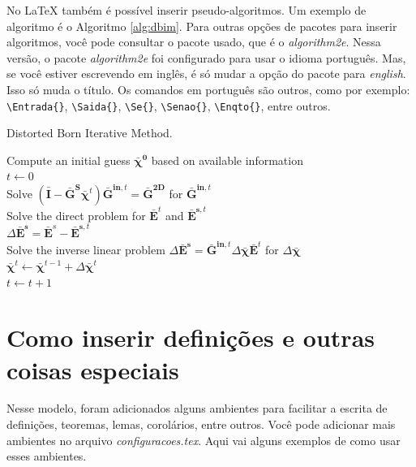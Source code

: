 		No LaTeX também é possível inserir pseudo-algoritmos. Um exemplo de algoritmo é o Algoritmo \ref{alg:dbim}. Para outras opções de pacotes para inserir algoritmos, você pode consultar o pacote usado, que é o \textit{algorithm2e}. Nessa versão, o pacote \textit{algorithm2e} foi configurado para usar o idioma português. Mas, se você estiver escrevendo em inglês, é só mudar a opção do pacote para \textit{english}. Isso só muda o título. Os comandos em português são outros, como por exemplo: \verb|\Entrada{}|, \verb|\Saida{}|, \verb|\Se{}|, \verb|\Senao{}|, \verb|\Enqto{}|, entre outros.
		\begin{algorithm}[!htb]
			\caption{Distorted Born Iterative Method.}
			\label{alg:dbim}
			Compute an initial guess $\boldsymbol{\bar{\chi}^0}$ based on available information \\
			$t\leftarrow0$ \\
			 {
				Solve $\left(\mathbf{\bar{I}} - \mathbf{\bar{G}^S}\boldsymbol{\bar{\chi}}^t\right)\mathbf{\bar{G}}^{\mathbf{in},t} = \mathbf{\bar{G}^{2D}}$ for $\mathbf{\bar{G}}^{\mathbf{in},t}$ \\
				Solve the direct problem for $\mathbf{\bar{E}}^t$ and $\mathbf{\bar{E}}^{\mathbf{s},t}$ \\
				$\Delta\mathbf{\bar{E}^s} = \mathbf{\bar{E}}^s - \mathbf{\bar{E}}^{\mathbf{s},t}$ \\
				Solve the inverse linear problem $\Delta\mathbf{\bar{E}^s} = \mathbf{\bar{G}}^{\mathbf{in},t}\Delta\boldsymbol{\bar{\chi}}\mathbf{\bar{E}}^t$ for $\Delta\boldsymbol{\bar{\chi}}$\\
				$\boldsymbol{\bar{\chi}}^t \leftarrow \boldsymbol{\bar{\chi}}^{t-1} + \Delta\boldsymbol{\bar{\chi}}^t$ \\
				$t\leftarrow t+1$\\
			}
		\end{algorithm}
	
	\chapter{Como inserir definições e outras coisas especiais}

		Nesse modelo, foram adicionados alguns ambientes para facilitar a escrita de definições, teoremas, lemas, corolários, entre outros. Você pode adicionar mais ambientes no arquivo \textit{configuracoes.tex}. Aqui vai alguns exemplos de como usar esses ambientes.

